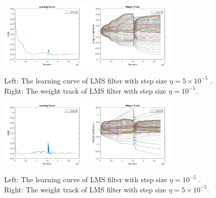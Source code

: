 \documentclass[conference]{IEEEtran}
\begin{document}
	\begin{figure}[htbp]
	\centering
	\includegraphics[width = 1.7in]{LMS_LC_eta4.jpg}
	\includegraphics[width=1.7in]{LMS_WT_3.jpg}
	\caption{Left: The learning curve of LMS filter with step size $\eta = 5\times 10^{-5}$ . Right: The weight track of LMS filter with step size $\eta =10^{-5}$.}
	\label{LMSeta2}
	\end{figure}

	\begin{figure}[htbp]
	\centering
	\includegraphics[width = 1.7in]{LMS_LC_eta5.jpg}
	\includegraphics[width=1.7in]{LMS_WT_2.jpg}
	\caption{Left: The learning curve of LMS filter with step size $\eta = 10^{-5}$ . Right: The weight track of LMS filter with step size $\eta =  5\times 10^{-5}$.}
	\label{LMSeta3}
	\end{figure}
\end{document}
